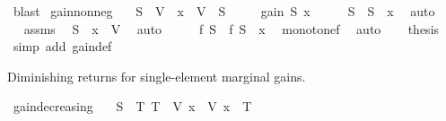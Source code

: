 \begin{isabellebody}
\ blast\isanewline
{}\isamarkupfalse%
%
\endisatagproof
{\isafoldproof}%
%
\isadelimproof
\isanewline
%
\endisadelimproof
\isanewline
{}\isamarkupfalse%
\ gain{\isacharunderscore}{\kern0pt}nonneg{\isacharcolon}{\kern0pt}\isanewline
\ \ \ {\isachardoublequoteopen}S\ {\isasymsubseteq}\ V{\isachardoublequoteclose}\ \ {\isachardoublequoteopen}x\ {\isasymin}\ V\ {\isacharminus}{\kern0pt}\ S{\isachardoublequoteclose}\isanewline
\ \ \ {\isachardoublequoteopen}{}\ {\isasymle}\ gain\ S\ x{\isachardoublequoteclose}\isanewline
%
\isadelimproof
%
\endisadelimproof
%
\isatagproof
{}\isamarkupfalse%
\ {\isacharminus}{\kern0pt}\isanewline
\ \ \isamarkupfalse%
\ {\isachardoublequoteopen}S\ {\isasymsubseteq}\ S\ {\isasymunion}\ {\isacharbraceleft}{\kern0pt}x{\isacharbraceright}{\kern0pt}{\isachardoublequoteclose}\ \isamarkupfalse%
\ auto\isanewline
\ \ \isamarkupfalse%
\ \isamarkupfalse%
\ assms\ \isamarkupfalse%
\ {\isachardoublequoteopen}S\ {\isasymunion}\ {\isacharbraceleft}{\kern0pt}x{\isacharbraceright}{\kern0pt}\ {\isasymsubseteq}\ V{\isachardoublequoteclose}\ \isamarkupfalse%
\ auto\isanewline
\ \ \isamarkupfalse%
\ \isamarkupfalse%
\ {\isachardoublequoteopen}f\ S\ {\isasymle}\ f\ {\isacharparenleft}{\kern0pt}S\ {\isasymunion}\ {\isacharbraceleft}{\kern0pt}x{\isacharbraceright}{\kern0pt}{\isacharparenright}{\kern0pt}{\isachardoublequoteclose}\ \isamarkupfalse%
\ monotone{\isacharunderscore}{\kern0pt}f\ \isamarkupfalse%
\ auto\isanewline
\ \ \isamarkupfalse%
\ {\isacharquery}{\kern0pt}thesis\ \isamarkupfalse%
\ {\isacharparenleft}{\kern0pt}simp\ add{\isacharcolon}{\kern0pt}\ gain{\isacharunderscore}{\kern0pt}def{\isacharparenright}{\kern0pt}\isanewline
{}\isamarkupfalse%
%
\endisatagproof
{\isafoldproof}%
%
\isadelimproof
%
\endisadelimproof
%
\begin{isamarkuptext}%
Diminishing returns for single-element marginal gains.%
\end{isamarkuptext}\isamarkuptrue%
\isamarkupfalse%
\ gain{\isacharunderscore}{\kern0pt}decreasing{\isacharcolon}{\kern0pt}\isanewline
\ \ \ {\isachardoublequoteopen}S\ {\isasymsubseteq}\ T{\isachardoublequoteclose}\ {\isachardoublequoteopen}T\ {\isasymsubseteq}\ V{\isachardoublequoteclose}\ {\isachardoublequoteopen}x\ {\isasymin}\ V{\isachardoublequoteclose}\ {\isachardoublequoteopen}x\ {\isasymnotin}\ T{\isachardoublequoteclose}\isanewline

\end{isabellebody}
